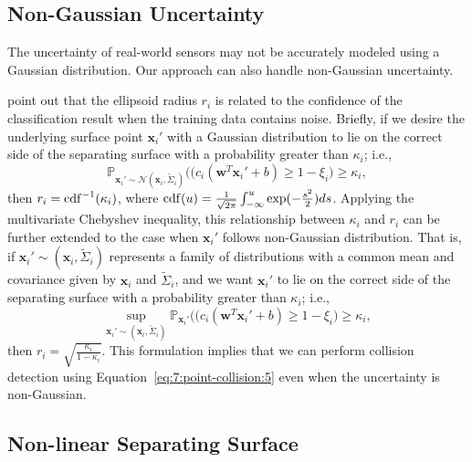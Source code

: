 \subsection{Non-Gaussian Uncertainty}
\label{sec:7:algorithm:2}
The uncertainty of real-world sensors may not be accurately modeled using a Gaussian distribution. Our approach can also handle non-Gaussian uncertainty.

\cite{Shivaswamy:2006:SOC} point out that the ellipsoid radius $r_i$ is related to the confidence of the classification result when the training data contains noise. Briefly, if we desire the underlying surface point $\mathbf x_i'$ with a Gaussian distribution to lie on the correct side of the separating surface with a probability greater than $\kappa_i$; i.e.,
\begin{equation}
\mathbb{P}_{\mathbf x_i'\sim \mathcal{N}(\mathbf x_i, \widetilde{\Sigma}_i)}\Big((c_i(\mathbf w^T \mathbf x_i' + b) \geq 1 - \xi_i\Big) \geq \kappa_i,
\end{equation}
then $r_i = \erf^{-1}(\kappa_i)$, where $\erf(u) = \frac{1}{\sqrt{2\pi}}\int_{-\infty}^{u}\exp(-\frac{s^2}{2})ds$.
Applying the multivariate Chebyshev inequality, this relationship between $\kappa_i$ and $r_i$ can be further extended to the case when $\mathbf x_i'$ follows non-Gaussian distribution. That is, if $\mathbf x_i' \sim (\mathbf x_i, \widetilde{\Sigma}_i)$ represents a family of distributions with a common mean and covariance given by $\mathbf x_i$ and $\widetilde{\Sigma}_i$, and we want $\mathbf x_i'$ to lie on the correct side of the separating surface with a probability greater than $\kappa_i$; i.e.,
\begin{equation}
\sup_{\mathbf x_i' \sim (\mathbf x_i, \widetilde{\Sigma}_i)} \mathbb{P}_{\mathbf x_i'}\Big((c_i(\mathbf w^T \mathbf x_i' + b) \geq 1 - \xi_i\Big) \geq \kappa_i,
\end{equation}
then $r_i = \sqrt{\frac{\kappa_i}{1-\kappa_i}}$. This formulation implies that we can perform collision detection using Equation~\ref{eq:7:point-collision:5}
even when the uncertainty is non-Gaussian.


\subsection{Non-linear Separating Surface}
\label{sec:7:algorithm:3}

